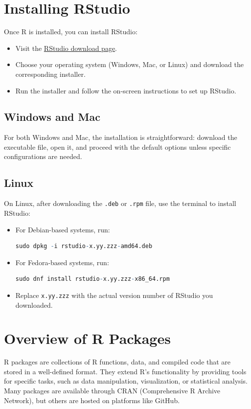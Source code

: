 \documentclass[10pt]{book}
\begin{document}
\section{Installing RStudio}
Once R is installed, you can install RStudio:
\begin{itemize}
    \item Visit the \href{https://www.rstudio.com/products/rstudio/download/#download}{RStudio download page}.
    \item Choose your operating system (Windows, Mac, or Linux) and download the corresponding installer.
    \item Run the installer and follow the on-screen instructions to set up RStudio.
\end{itemize}

\subsection{Windows and Mac}
For both Windows and Mac, the installation is straightforward: download the executable file, open it, and proceed with the default options unless specific configurations are needed.

\subsection{Linux}
On Linux, after downloading the \texttt{.deb} or \texttt{.rpm} file, use the terminal to install RStudio:
\begin{itemize}
    \item For Debian-based systems, run:
    \begin{lstlisting}[language=R]
    sudo dpkg -i rstudio-x.yy.zzz-amd64.deb
    \end{lstlisting}
    \item For Fedora-based systems, run:
    \begin{lstlisting}[language=R]
    sudo dnf install rstudio-x.yy.zzz-x86_64.rpm
    \end{lstlisting}
    \item Replace \texttt{x.yy.zzz} with the actual version number of RStudio you downloaded.
\end{itemize}

\section{Overview of R Packages}
R packages are collections of R functions, data, and compiled code that are stored in a well-defined format. They extend R's functionality by providing tools for specific tasks, such as data manipulation, visualization, or statistical analysis. Many packages are available through CRAN (Comprehensive R Archive Network), but others are hosted on platforms like GitHub.
\end{document}
